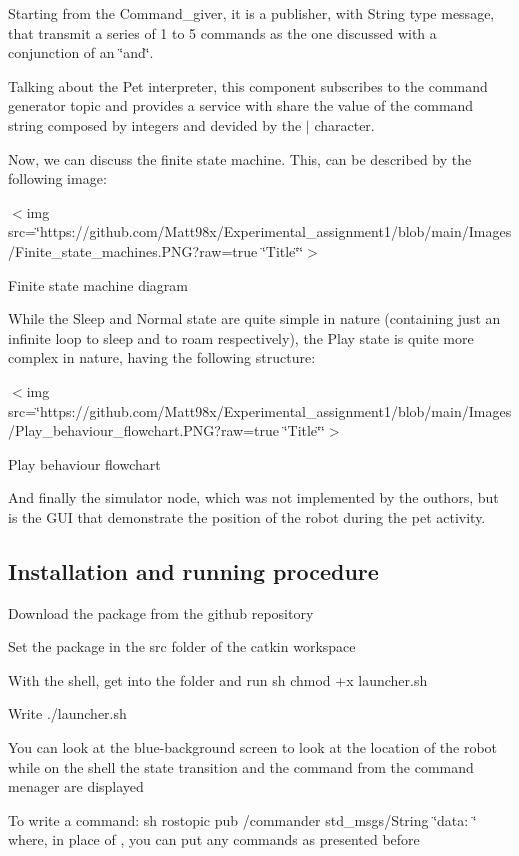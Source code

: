 Starting from the Command\+\_\+giver, it is a publisher, with String type message, that transmit a series of 1 to 5 commands as the one discussed with a conjunction of an \char`\"{}and\char`\"{}.

Talking about the Pet interpreter, this component subscribes to the command generator topic and provides a service with share the value of the command string composed by integers and devided by the \textquotesingle{}$\vert$\textquotesingle{} character.

Now, we can discuss the finite state machine. This, can be described by the following image\+:

$<$img src=\char`\"{}https\+://github.\+com/\+Matt98x/\+Experimental\+\_\+assignment1/blob/main/\+Images/\+Finite\+\_\+state\+\_\+machines.\+P\+N\+G?raw=true \char`\"{}Title\char`\"{}\char`\"{}$>$ 

Finite state machine diagram 

While the \textquotesingle{}Sleep\textquotesingle{} and \textquotesingle{}Normal\textquotesingle{} state are quite simple in nature (containing just an infinite loop to sleep and to roam respectively), the \textquotesingle{}Play\textquotesingle{} state is quite more complex in nature, having the following structure\+: 

$<$img src=\char`\"{}https\+://github.\+com/\+Matt98x/\+Experimental\+\_\+assignment1/blob/main/\+Images/\+Play\+\_\+behaviour\+\_\+flowchart.\+P\+N\+G?raw=true \char`\"{}Title\char`\"{}\char`\"{}$>$ 

Play behaviour flowchart 

And finally the simulator node, which was not implemented by the outhors, but is the G\+UI that demonstrate the position of the robot during the pet activity.

\subsection*{Installation and running procedure}


\begin{DoxyItemize}
\item Download the package from the github repository
\item Set the package in the src folder of the catkin workspace
\item With the shell, get into the folder and run \textquotesingle{}\textquotesingle{}\textquotesingle{}sh chmod +x launcher.\+sh \textquotesingle{}\textquotesingle{}\textquotesingle{}
\item Write ./launcher.sh
\item You can look at the blue-\/background screen to look at the location of the robot while on the shell the state transition and the command from the command menager are displayed
\item To write a command\+: \textquotesingle{}\textquotesingle{}\textquotesingle{}sh rostopic pub /commander std\+\_\+msgs/\+String \char`\"{}data\+: \textquotesingle{}\textquotesingle{}\char`\"{} \textquotesingle{}\textquotesingle{}\textquotesingle{} where, in place of \textquotesingle{}\textquotesingle{}, you can put any commands as presented before
\end{DoxyItemize}

